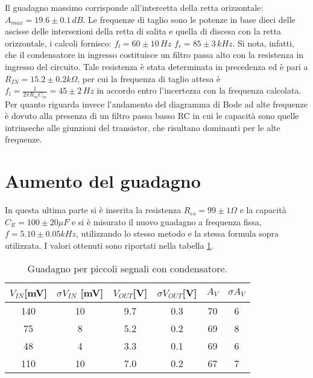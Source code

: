 \documentclass[10pt,a4paper]{article}
\begin{document}
Il guadagno massimo corrisponde all'intercetta della retta orizzontale: $A_{max}=19.6  \pm 0.1\, dB$. Le frequenze di taglio sono le potenze in base dieci delle ascisse delle intersezioni della retta di salita e quella di discesa con la retta orizzontale, i calcoli fornisco: $f_l=60\pm10 \, Hz$ $f_r=85 \pm 3\, kHz$. Si nota, infatti, che il condensatore in ingresso costituisce un filtro passa alto con la resistenza in ingresso del circuito. Tale resistenza è stata determinata in precedenza ed è pari a $R_{IN} = 15.2 \pm 0.2 k \Omega$, per cui la frequenza di taglio attesa è $f_l = \frac{1}{2 \pi R_{in}C_{in}}=45 \pm 2\, Hz$ in  accordo entro l'incertezza con la frequenza calcolata. Per quanto riguarda  invece l'andamento del diagramma di Bode ad alte frequenze è dovuto alla presenza di un filtro passa basso RC in cui le capacità sono quelle intrinseche alle giunzioni del transistor, che risultano dominanti per le alte frequenze.


\section{Aumento del guadagno}
In questa ultima parte si è inserita la resistenza $R_{es}= 99\pm 1 \Omega$ e la capacità $C_E= 100\pm20  \mu F$ e si è misurato il nuovo guadagno a frequenza fissa, $f=5.10 \pm0.05 kHz$, utilizzando lo stesso metodo e la stessa formula sopra utilizzata. I valori ottenuti sono riportati nella tabella \ref{guadpic}.

\begin{table}[h]
\centering
\begin{tabular}{|c|c|c|c|c|c|}
\hline 
$V_{IN}$[mV] & $\sigma V_{IN}$ [mV] & $V_{OUT}$[V] & $\sigma V_{OUT}$[V] & $A_V$ & $\sigma A_V$ \\ 
\hline
140 & 10 & 9.7 & 0.3 & 70 & 6\\
75 & 8 & 5.2 & 0.2 & 69 & 8\\
48 & 4 & 3.3 & 0.1 & 69 & 6\\
110 & 10 & 7.0 & 0.2 & 67 & 7\\
\hline
\end{tabular}
\caption{Guadagno per piccoli segnali con condensatore.}
\label{guadpic}
\end{table}
\end{document}
